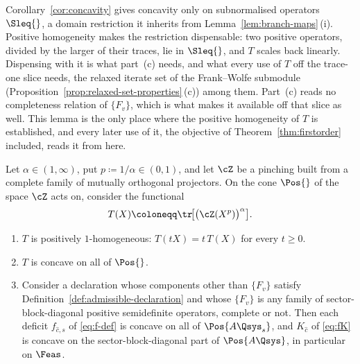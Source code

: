 
Corollary~\ref{cor:concavity} gives concavity only on subnormalised
operators $\Sleq{}$, a domain restriction it inherits from
Lemma~\ref{lem:branch-maps}\,(i). Positive homogeneity makes the restriction
dispensable: two positive operators, divided by the larger of their
traces, lie in $\Sleq{}$, and $T$ scales back linearly. Dispensing with it
is what part~(c) needs, and what every use of $T$ off the trace-one slice
needs, the relaxed iterate set of the Frank--Wolfe submodule
(Proposition~\ref{prop:relaxed-set-properties}\,(c)) among them. Part~(c) reads no
completeness relation of $\{F_v\}$, which is what makes it available off
that slice as well. This lemma is the only place where the positive
homogeneity of $T$ is established, and every later use of it, the
objective of Theorem~\ref{thm:firstorder} included, reads it from here.

\begin{lemma}\label{lem:cone-concavity}
Let $\alpha\in(1,\infty)$, put $p\coloneqq1/\alpha\in(0,1)$, and let $\cZ$
be a pinching built from a complete family of mutually orthogonal
projectors. On the cone $\Pos{}$ of the space $\cZ$ acts on, consider the
functional
\begin{equation}\label{eq:Tcone}
  T(X)\coloneqq\tr\!\big[\big(\cZ(X^{p})\big)^{\alpha}\big].
\end{equation}
\begin{enumerate}[label=(\alph*),leftmargin=2.4em]
\item $T$ is positively $1$-homogeneous: $T(tX)=t\,T(X)$ for every
$t\ge0$.
\item $T$ is concave on all of $\Pos{}$.
\item Consider a declaration whose components other than $\{F_v\}$
satisfy Definition~\ref{def:admissible-declaration} and whose $\{F_v\}$ is any family of
sector-block-diagonal positive semidefinite operators, complete or not.
Then each deficit $f_{\hat c,s}$ of \eqref{eq:f-def} is concave on all of
$\Pos{A\Qsys_s}$, and $K_{\hat c}$ of \eqref{eq:fK} is concave on the
sector-block-diagonal part of $\Pos{A\Qsys}$, in particular on $\Feas$.
\end{enumerate}
\end{lemma}

